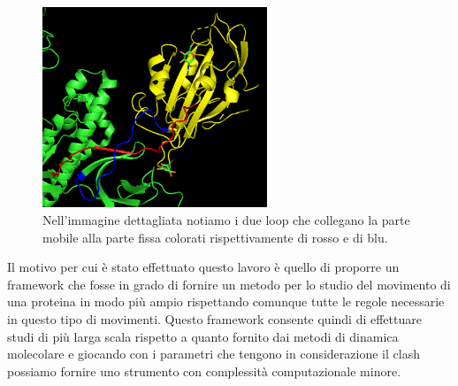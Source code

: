 \begin{figure}
	\centering
	\includegraphics[width=0.6\textwidth]{Immagini/Struttura_spike_dettaglio.png}
	\caption{Nell'immagine dettagliata notiamo i due loop che collegano la parte mobile alla parte fissa colorati rispettivamente di rosso e di blu.}
	\label{fig:Dettaglio}
\end{figure}

Il motivo per cui è stato effettuato questo lavoro è quello di proporre un framework che fosse in grado di fornire un metodo per lo studio del movimento di una proteina in modo più ampio rispettando comunque tutte le regole necessarie in questo tipo di movimenti. Questo framework consente quindi di effettuare studi di più larga scala rispetto a quanto fornito dai metodi di dinamica molecolare e giocando con i parametri che tengono in considerazione il clash possiamo fornire uno strumento con complessità computazionale minore. 

